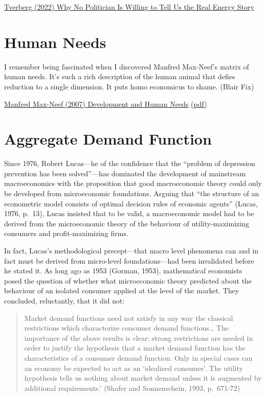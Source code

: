 \documentclass[
]{book}
\begin{document}
\href{https://ourfiniteworld.com/2022/08/23/why-no-politician-is-willing-to-tell-us-the-real-energy-story/}{Tverberg (2022) Why No Politician Is Willing to Tell Us the Real Energy Story}

\hypertarget{human-needs}{%
\section{Human Needs}\label{human-needs}}

I remember being fascinated when I discovered Manfred Max-Neef's matrix of human needs. It's such a rich description of the human animal that defies reduction to a single dimension. It puts homo economicus to shame. (Blair Fix)

\href{https://t.co/OIXQbLvM0z?amp=1}{Manfred Max-Neef (2007) Development and Human Needs}
\href{pdf/Manfred_Max-Neef_2007_Fundamental_Human_Needs.pdf}{(pdf)}

\hypertarget{aggregate-demand-function}{%
\section{Aggregate Demand Function}\label{aggregate-demand-function}}

Since 1976, Robert Lucas---he of the confidence that the ``problem of depression prevention has been solved''---has dominated the development of mainstream macroeconomics with the proposition that good macroeconomic theory could only be developed from microeconomic foundations. Arguing that ``the structure of an econometric model consists of optimal decision rules of economic agents'' (Lucas, 1976, p.~13), Lucas insisted that to be valid, a macroeconomic model had to be derived from the microeconomic theory of the behaviour of utility-maximizing consumers and profit-maximizing firms.

In fact, Lucas's methodological precept---that macro level phenomena can and in fact must be derived from micro-level foundations---had been invalidated before he stated it. As long ago as 1953 (Gorman, 1953), mathematical economists posed the question of whether what microeconomic theory predicted about the behaviour of an isolated consumer applied at the level of the market. They concluded, reluctantly, that it did not:

\begin{quote}
Market demand functions need not satisfy in any way the classical restrictions which characterize consumer demand functions\ldots{} The importance of the above results is clear: strong restrictions are needed in order to justify the hypothesis that a market demand function has the characteristics of a consumer demand function. Only in special cases can an economy be expected to act as an `idealized consumer'. The utility hypothesis tells us nothing about market demand unless it is augmented by additional requirements.' (Shafer and Sonnenschein, 1993, p.~671-72)
\end{quote}
\end{document}
